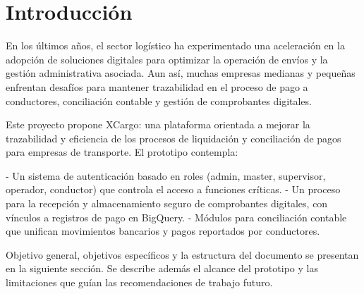 \chapter{Introducción}

En los últimos años, el sector logístico ha experimentado una aceleración en la adopción de soluciones digitales para optimizar la operación de envíos y la gestión administrativa asociada. Aun así, muchas empresas medianas y pequeñas enfrentan desafíos para mantener trazabilidad en el proceso de pago a conductores, conciliación contable y gestión de comprobantes digitales.

Este proyecto propone XCargo: una plataforma orientada a mejorar la trazabilidad y eficiencia de los procesos de liquidación y conciliación de pagos para empresas de transporte. El prototipo contempla:

- Un sistema de autenticación basado en roles (admin, master, supervisor, operador, conductor) que controla el acceso a funciones críticas.
- Un proceso para la recepción y almacenamiento seguro de comprobantes digitales, con vínculos a registros de pago en BigQuery.
- Módulos para conciliación contable que unifican movimientos bancarios y pagos reportados por conductores.

Objetivo general, objetivos específicos y la estructura del documento se presentan en la siguiente sección. Se describe además el alcance del prototipo y las limitaciones que guían las recomendaciones de trabajo futuro.
